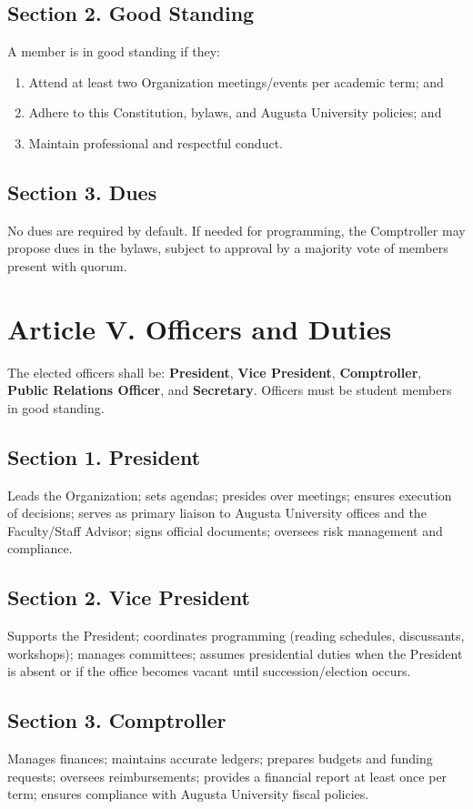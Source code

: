 \documentclass[12pt]{article}
\newcommand{\university}{Augusta University}
\begin{document}
\subsection*{Section 2. Good Standing}
A member is in good standing if they:
\begin{enumerate}[label=\alph*)]
    \item Attend at least two Organization meetings/events per academic term; and
    \item Adhere to this Constitution, bylaws, and \university{} policies; and
    \item Maintain professional and respectful conduct.
\end{enumerate}

\subsection*{Section 3. Dues}
No dues are required by default. If needed for programming, the Comptroller may propose dues in the bylaws, subject to approval by a majority vote of members present with quorum.

\section*{Article V. Officers and Duties}
The elected officers shall be: \textbf{President}, \textbf{Vice President}, \textbf{Comptroller}, \textbf{Public Relations Officer}, and \textbf{Secretary}. Officers must be student members in good standing.

\subsection*{Section 1. President}
Leads the Organization; sets agendas; presides over meetings; ensures execution of decisions; serves as primary liaison to \university{} offices and the Faculty/Staff Advisor; signs official documents; oversees risk management and compliance.

\subsection*{Section 2. Vice President}
Supports the President; coordinates programming (reading schedules, discussants, workshops); manages committees; assumes presidential duties when the President is absent or if the office becomes vacant until succession/election occurs.

\subsection*{Section 3. Comptroller}
Manages finances; maintains accurate ledgers; prepares budgets and funding requests; oversees reimbursements; provides a financial report at least once per term; ensures compliance with \university{} fiscal policies.
\end{document}
